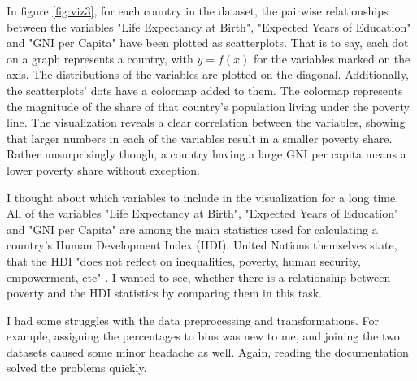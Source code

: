 \documentclass[11pt,a4paper,titlepage]{article}
\begin{document}
In figure \ref{fig:viz3}, for each country in the dataset, the pairwise relationships between the variables "Life Expectancy at Birth", "Expected Years of Education" and "GNI per Capita" have been plotted as scatterplots. That is to say, each dot on a graph represents a country, with $y = f(x)$ for the variables marked on the axis.  The distributions of the variables are plotted on the diagonal. Additionally, the scatterplots' dots have a colormap added to them. The colormap represents the magnitude of the share of that country's population living under the poverty line. The visualization reveals a clear correlation between the variables, showing that larger numbers in each of the variables result in a smaller poverty share. Rather unsurprisingly though, a country having a large GNI per capita means a lower poverty share without exception.

I thought about which variables to include in the visualization for a long time. All of the variables "Life Expectancy at Birth", "Expected Years of Education" and "GNI per Capita" are among the main statistics used for calculating a country's Human Development Index (HDI). United Nations themselves state, that the HDI "does not reflect on inequalities, poverty, human security, empowerment, etc" \cite{hdi}. I wanted to see, whether there is a relationship between poverty and the HDI statistics by comparing them in this task.

I had some struggles with the data preprocessing and transformations. For example, assigning the percentages to bins was new to me, and joining the two datasets caused some minor headache as well. Again, reading the documentation solved the problems quickly.

\newpage


\end{document}
